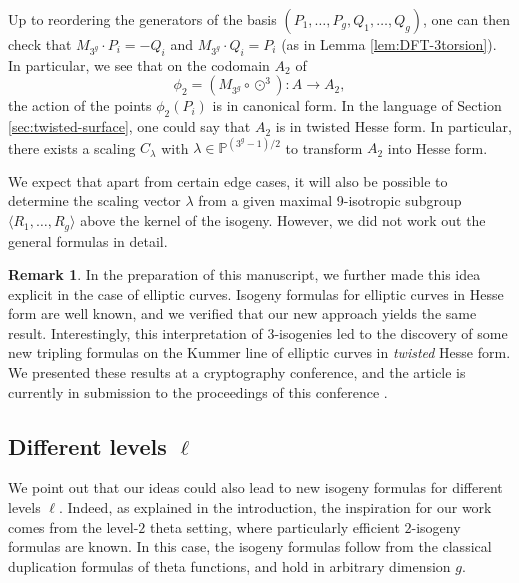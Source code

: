 \documentclass[11pt]{amsart}
\theoremstyle{definition}
\newtheorem{remark}[theorem]{Remark}
\newcommand{\PP}{\mathbb{P}}
\newcommand{\cube}{\odot^3}
\begin{document}
Up to reordering the generators of the basis $(P_1, \dots, P_g, Q_1,\dots, Q_g)$, one can then check that $M_{3^g} \cdot P_i = -Q_i$ and $M_{3^g}\cdot Q_i = P_i$ (as in Lemma \ref{lem:DFT-3torsion}). In particular, we see that on the codomain $A_2$ of 
\[
\phi_2 = (M_{3^g} \circ \cube): A \to A_2,
\]
the action of the points $\phi_2(P_i)$ is in canonical form. In the language of Section \ref{sec:twisted-surface}, one could say that $A_2$ is in twisted Hesse form. In particular, there exists a scaling $C_\lambda$ with $\lambda \in \PP^{(3^g-1)/2}$ to transform $A_2$ into  Hesse form. 

We expect that apart from certain edge cases, it will also be possible to determine the scaling vector $\lambda$ from a given maximal 9-isotropic subgroup $\langle R_1, \dots, R_g\rangle$ above the kernel of the isogeny. However, we did not work out the general formulas in detail. 

\begin{remark}
	In the preparation of this manuscript, we further made this idea explicit in the case of elliptic curves. Isogeny formulas for elliptic curves in Hesse form are well known, and we verified that our new approach yields the same result. Interestingly, this interpretation of $3$-isogenies led to the discovery of some new tripling formulas on the Kummer line of elliptic curves in {\em twisted} Hesse form. We presented these results at a cryptography conference, and the article is currently in submission to the proceedings of this conference \cite{hessiantripling}. 
\end{remark}


\subsection{Different levels $\ell$}

We point out that our ideas could also lead to new isogeny formulas for different levels $\ell$. Indeed, as explained in the introduction, the inspiration for our work comes from the level-$2$ theta setting, where particularly efficient $2$-isogeny formulas are known. In this case, the isogeny formulas follow from the classical duplication formulas of theta functions, and hold in arbitrary dimension $g$. 
\end{document}
